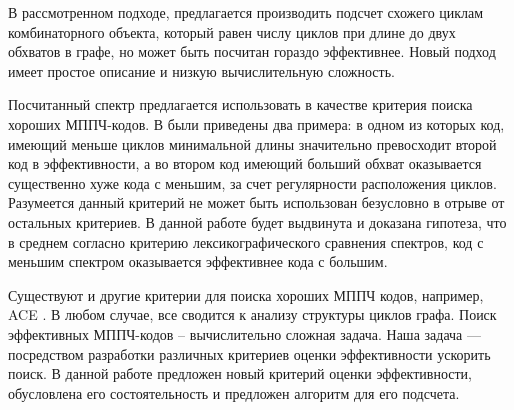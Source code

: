 В рассмотренном подходе, предлагается производить подсчет схожего циклам комбинаторного объекта,
который равен числу циклов при длине до двух обхватов в графе, но может быть посчитан гораздо эффективнее.
Новый подход имеет простое описание и низкую вычислительную сложность.

Посчитанный спектр предлагается использовать в качестве критерия поиска хороших МППЧ-кодов.
В \cite{algorithm-for-counting-for-counting-short-cycles-in-bipartite-graphs} были приведены два примера:
в одном из которых код, имеющий меньше циклов минимальной длины значительно превосходит второй код в
эффективности, а во
втором код имеющий больший обхват оказывается существенно хуже кода с меньшим, за счет регулярности
расположения циклов. Разумеется данный критерий не может быть использован безусловно
в отрыве от остальных критериев. В данной работе будет выдвинута и доказана гипотеза, что в среднем согласно
критерию лексикографического сравнения спектров, код с меньшим спектром оказывается эффективнее кода с большим.

Существуют и другие критерии для поиска хороших МППЧ кодов, например, ACE \cite{ace}. 
В любом случае, все сводится к анализу структуры циклов графа. 
Поиск эффективных МППЧ-кодов -- вычислительно сложная задача.
Наша задача --- посредством разработки различных критериев оценки эффективности ускорить поиск. 
В данной работе предложен новый критерий оценки эффективности, обусловлена его состоятельность и предложен
алгоритм для его подсчета.









































